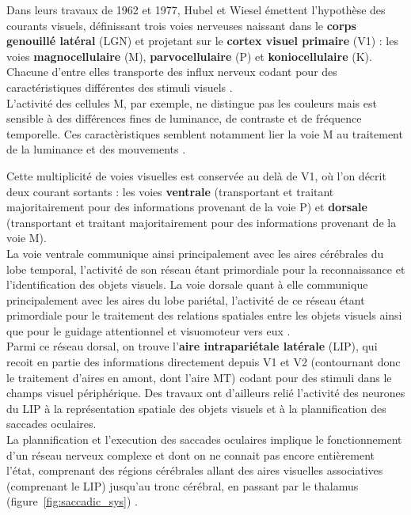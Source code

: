 Dans leurs travaux de 1962 et 1977, Hubel et Wiesel émettent l'hypothèse des courants visuels, définissant trois voies nerveuses naissant dans le \textbf{corps genouillé latéral} (LGN) et projetant sur le \textbf{cortex visuel primaire} (V1) :  les voies \textbf{magnocellulaire} (M),  \textbf{parvocellulaire} (P) et  \textbf{koniocellulaire} (K). Chacune d'entre elles transporte des influx nerveux codant pour des caractéristiques différentes des stimuli visuels \autocite{Denison2014, Werner2014}.\\
L'activité des cellules M, par exemple, ne distingue pas les couleurs mais est sensible à des différences fines de luminance, de contraste et de fréquence temporelle. Ces caractèristiques semblent notamment lier la voie M au traitement de la luminance et des mouvements \autocite{Denison2014, Werner2014}.

Cette multiplicité de voies visuelles est conservée au delà de V1, où l'on décrit deux courant sortants : les voies \textbf{ventrale} (transportant et traitant majoritairement pour des informations provenant de la voie P) et \textbf{dorsale} (transportant et traitant majoritairement pour des informations provenant de la voie M)\autocite{Werner2014, Freeman2011, Goodale2004}.\\
La voie ventrale communique ainsi principalement avec les aires cérébrales du lobe temporal, l'activité de son réseau étant primordiale pour la reconnaissance et l'identification des objets visuels. La voie dorsale quant à elle communique principalement avec les aires du lobe pariétal, l'activité de ce réseau étant primordiale pour le traitement des relations spatiales entre les objets visuels ainsi que pour le guidage attentionnel et visuomoteur vers eux \autocite{Werner2014, Freeman2011, Goodale2004}.\\
Parmi ce réseau dorsal, on trouve l'\textbf{aire intrapariétale latérale} (LIP), qui recoit en partie des informations directement depuis V1 et V2 (contournant donc le traitement d'aires en amont, dont l'aire MT) codant pour des stimuli dans le champs visuel périphérique. Des travaux ont d'ailleurs relié l'activité des neurones du LIP à la représentation spatiale des objets visuels et à la plannification des saccades oculaires\autocite{Werner2014}.\\
La plannification et l'execution des saccades oculaires implique le fonctionnement d'un réseau nerveux complexe et dont on ne connait pas encore entièrement l'état, comprenant des régions cérébrales allant des aires visuelles associatives (comprenant le LIP) jusqu'au tronc cérébral, en passant par le thalamus (figure~\ref{fig:saccadic_sys}) \autocite{Zhaoping2014}.

